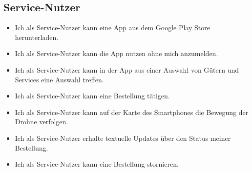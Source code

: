 \subsection{Service-Nutzer}
\begin{itemize}
\item Ich als Service-Nutzer kann eine App aus dem Google Play Store herunterladen.
\item Ich als Service-Nutzer kann die App nutzen ohne mich anzumelden.
\item Ich als Service-Nutzer kann in der App aus einer Auswahl von Gütern und Services eine Auswahl treffen.
\item Ich als Service-Nutzer kann eine Bestellung tätigen.
\item Ich als Service-Nutzer kann auf der Karte des Smartphones die Bewegung der Drohne verfolgen.
\item Ich als Service-Nutzer erhalte textuelle Updates über den Status meiner Bestellung.
\item Ich als Service-Nutzer kann eine Bestellung stornieren.
\end{itemize}
